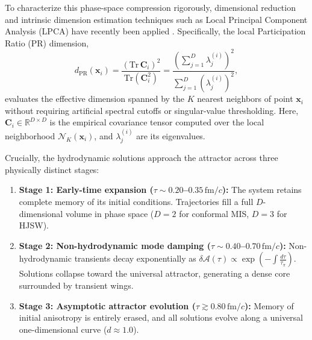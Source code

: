\documentclass[11pt,a4paper]{article}
\begin{document}
To characterize this phase-space compression rigorously, dimensional reduction and intrinsic dimension estimation techniques such as Local Principal Component Analysis (LPCA) have recently been applied \cite{Campadelli2015,LittleMaggioni2009}. Specifically, the local Participation Ratio (PR) dimension,
\begin{equation}
    d_{\mathrm{PR}}(\mathbf{x}_i) = \frac{\left(\mathrm{Tr}\,\mathbf{C}_i\right)^2}{\mathrm{Tr}\left(\mathbf{C}_i^2\right)} = \frac{\left(\sum_{j=1}^D \lambda_j^{(i)}\right)^2}{\sum_{j=1}^D \left(\lambda_j^{(i)}\right)^2},
    \label{eq:pr_dimension}
\end{equation}
evaluates the effective dimension spanned by the $K$ nearest neighbors of point $\mathbf{x}_i$ without requiring artificial spectral cutoffs or singular-value thresholding. Here, $\mathbf{C}_i \in \mathbb{R}^{D \times D}$ is the empirical covariance tensor computed over the local neighborhood $\mathcal{N}_K(\mathbf{x}_i)$, and $\lambda_j^{(i)}$ are its eigenvalues.

Crucially, the hydrodynamic solutions approach the attractor across three physically distinct stages:
\begin{enumerate}
    \item \textbf{Stage 1: Early-time expansion ($\tau \sim 0.20$--$0.35\,\mathrm{fm}/c$):} The system retains complete memory of its initial conditions. Trajectories fill a full $D$-dimensional volume in phase space ($D=2$ for conformal MIS, $D=3$ for HJSW).
    \item \textbf{Stage 2: Non-hydrodynamic mode damping ($\tau \sim 0.40$--$0.70\,\mathrm{fm}/c$):} Non-hydrodynamic transients decay exponentially as $\delta\mathcal{A}(\tau) \propto \exp\left(-\int \frac{d\tau}{\tau_\pi}\right)$. Solutions collapse toward the universal attractor, generating a dense core surrounded by transient wings.
    \item \textbf{Stage 3: Asymptotic attractor evolution ($\tau \gtrsim 0.80\,\mathrm{fm}/c$):} Memory of initial anisotropy is entirely erased, and all solutions evolve along a universal one-dimensional curve ($d \approx 1.0$).
\end{enumerate}
\end{document}
